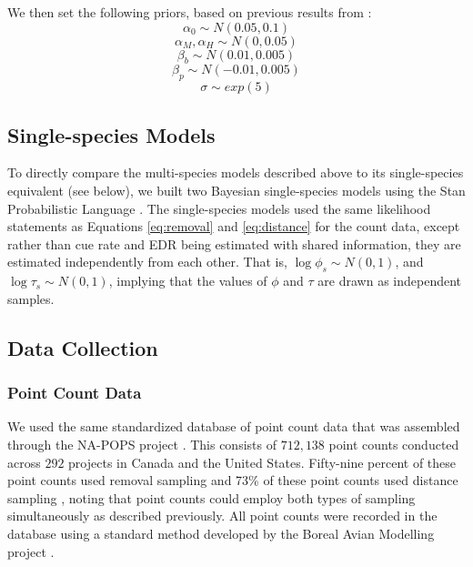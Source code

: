 \documentclass[12pt]{article}
\begin{document}
We then set the following priors, based on previous results from \citet{solymos_phylogeny_2018}:
$$\alpha_0 \sim N(0.05, 0.1)$$
$$ \alpha_M, \alpha_H \sim N(0, 0.05)$$
$$ \beta_b \sim N(0.01, 0.005)$$
$$ \beta_p \sim N(-0.01, 0.005) $$
$$\sigma \sim exp(5)$$

\subsection{Single-species Models}

\par To directly compare the multi-species models described above to its single-species equivalent (see below), we built two Bayesian single-species models using the Stan Probabilistic Language \citep{stan_development_team_stan_2024}.
The single-species models used the same likelihood statements as Equations \ref{eq:removal} and \ref{eq:distance} for the count data, except rather than cue rate and EDR being estimated with shared information, they are estimated independently from each other.
That is, $\log \phi_s \sim N(0,1)$, and $\log \tau_s \sim N(0,1)$, implying that the values of $\phi$ and $\tau$ are drawn as independent samples.

\subsection{Data Collection}
\subsubsection{Point Count Data}
\par We used the same standardized database of point count data that was assembled through the NA-POPS project \citep{edwards_point_2023}. 
This consists of $712,138$ point counts conducted across $292$ projects in Canada and the United States.
Fifty-nine percent of these point counts used removal sampling \citep{alldredge_time--detection_2007, farnsworth_removal_2002} and 73\% of these point counts used distance sampling \citep{buckland_introduction_2001, buckland_distance_2015}, noting that point counts could employ both types of sampling simultaneously as described previously.
All point counts were recorded in the database using a standard method developed by the Boreal Avian Modelling project \citep{barker_ecological_2015}.
\end{document}
